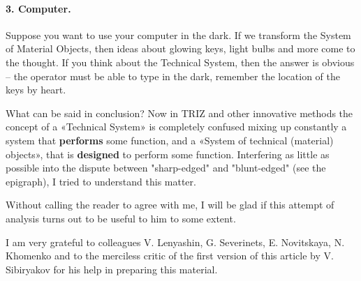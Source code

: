 \documentclass[11pt,a4paper]{article}
\begin{document}
\paragraph{3. Computer.}
Suppose you want to use your computer in the dark. If we transform the System
of Material Objects, then ideas about glowing keys, light bulbs and more come
to the thought. If you think about the Technical System, then the answer is
obvious -- the operator must be able to type in the dark, remember the
location of the keys by heart.

What can be said in conclusion? Now in TRIZ and other innovative methods the
concept of a «Technical System» is completely confused mixing up constantly a
system that \textbf{performs} some function, and a «System of technical
(material) objects», that is \textbf{designed} to perform some function.
Interfering as little as possible into the dispute between "sharp-edged" and
"blunt-edged" (see the epigraph), I tried to understand this matter.

Without calling the reader to agree with me, I will be glad if this attempt of
analysis turns out to be useful to him to some extent.

I am very grateful to colleagues V. Lenyashin, G. Severinets, E. Novitskaya,
N. Khomenko and to the merciless critic of the first version of this article
by V. Sibiryakov for his help in preparing this material.
\end{document}
